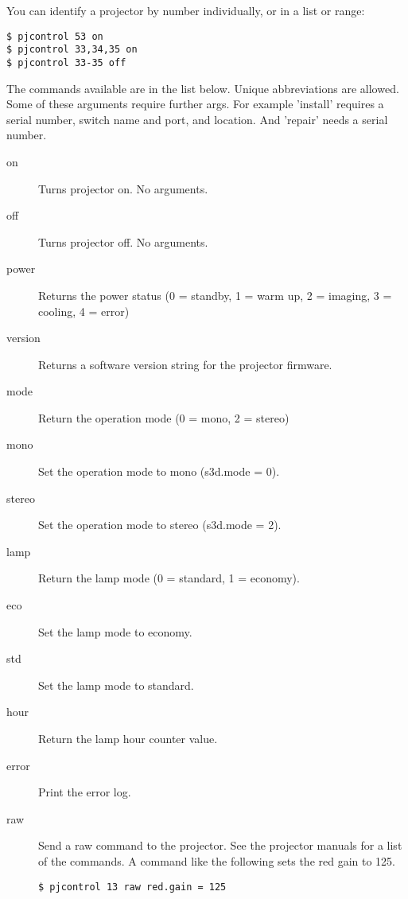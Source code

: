 \documentclass[11pt]{article}
\begin{document}
You can identify a projector by number individually, or in a list or
range:

\begin{verbatim}
$ pjcontrol 53 on
$ pjcontrol 33,34,35 on
$ pjcontrol 33-35 off
\end{verbatim}

The commands available are in the list below.  Unique abbreviations
are allowed. Some of these arguments require further args. For example
'install' requires a serial number, switch name and port, and
location. And 'repair' needs a serial number.

\begin{description}
\item[on] Turns projector on.  No arguments.

\item[off] Turns projector off.  No arguments.

\item[power] Returns the power status (0 = standby, 1 = warm up, 2 = imaging,
3 = cooling, 4 = error)

\item[version] Returns a software version string for the projector firmware.

\item[mode] Return the operation mode (0 = mono, 2 = stereo)

\item[mono] Set the operation mode to mono (s3d.mode = 0).

\item[stereo] Set the operation mode to stereo (s3d.mode = 2).

\item[lamp] Return the lamp mode (0 = standard, 1 = economy).

\item[eco] Set the lamp mode to economy.

\item[std] Set the lamp mode to standard.

\item[hour] Return the lamp hour counter value.

\item[error] Print the error log.

\item[raw] Send a raw command to the projector.  See the projector
  manuals for a list of the commands.  A command like the following
  sets the red gain to 125.

\begin{verbatim}
$ pjcontrol 13 raw red.gain = 125
\end{verbatim}
  

\end{description}
\end{document}
